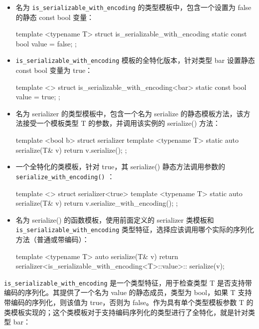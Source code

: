 \begin{itemize}
\item
名为 \verb|is_serializable_with_encoding| 的类型模板中，包含一个设置为 false 的静态 const bool 变量：

\begin{cpp}
template <typename T>
struct is_serializable_with_encoding
{
    static const bool value = false;
};
\end{cpp}

\item
\verb|is_serializable_with_encoding| 模板的全特化版本，针对类型 bar 设置静态 const bool 变量为 true：

\begin{cpp}
template <>
struct is_serializable_with_encoding<bar>
{
    static const bool value = true;
};
\end{cpp}

\item
名为 serializer 的类型模板中，包含一个名为 serialize 的静态模板方法，该方法接受一个模板类型 T 的参数，并调用该实例的 serialize() 方法：

\begin{cpp}
template <bool b>
struct serializer
{
    template <typename T>
    static auto serialize(T& v)
    {
        return v.serialize();
    }
};
\end{cpp}

\item
一个全特化的类模板，针对 true，其 serialize() 静态方法调用参数的 \verb|serialize_with_encoding()| ：

\begin{cpp}
template <>
struct serializer<true>
{
    template <typename T>
    static auto serialize(T& v)
    {
        return v.serialize_with_encoding();
    }
};
\end{cpp}

\item
名为 serialize() 的函数模板，使用前面定义的 serializer 类模板和 \verb|is_serializable_with_encoding| 类型特征，选择应该调用哪个实际的序列化方法（普通或带编码）：

\begin{cpp}
template <typename T>
auto serialize(T& v)
{
    return serializer<is_serializable_with_encoding<T>::value>::
    serialize(v);
}
\end{cpp}
\end{itemize}


\verb|is_serializable_with_encoding| 是一个类型特征，用于检查类型 T 是否支持带编码的序列化。其提供了一个名为 value 的静态成员，类型为 bool，如果 T 支持带编码的序列化，则该值为 true，否则为 false。作为具有单个类型模板参数 T 的类模板实现的；这个类模板对于支持编码序列化的类型进行了全特化，就是针对类型 bar：

